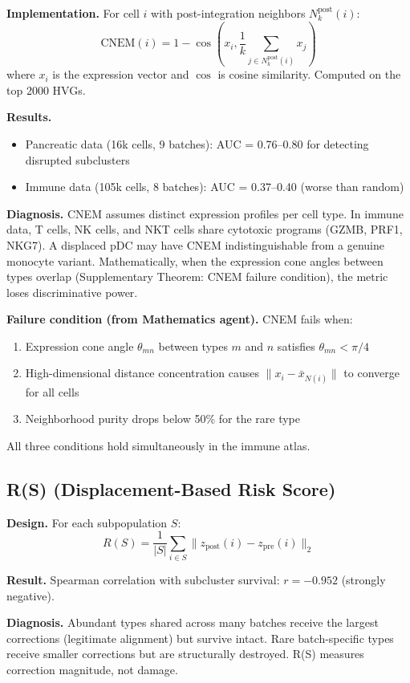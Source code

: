 \documentclass[10pt]{article}
\begin{document}
\textbf{Implementation.} For cell $i$ with post-integration neighbors $N_k^{\text{post}}(i)$:
$$\text{CNEM}(i) = 1 - \cos\left(x_i, \frac{1}{k}\sum_{j \in N_k^{\text{post}}(i)} x_j\right)$$
where $x_i$ is the expression vector and $\cos$ is cosine similarity. Computed on the top 2000 HVGs.

\textbf{Results.}
\begin{itemize}
\item Pancreatic data (16k cells, 9 batches): AUC = 0.76--0.80 for detecting disrupted subclusters
\item Immune data (105k cells, 8 batches): AUC = 0.37--0.40 (worse than random)
\end{itemize}

\textbf{Diagnosis.} CNEM assumes distinct expression profiles per cell type. In immune data, T cells, NK cells, and NKT cells share cytotoxic programs (GZMB, PRF1, NKG7). A displaced pDC may have CNEM indistinguishable from a genuine monocyte variant. Mathematically, when the expression cone angles between types overlap (Supplementary Theorem: CNEM failure condition), the metric loses discriminative power.

\textbf{Failure condition (from Mathematics agent).} CNEM fails when:
\begin{enumerate}
\item Expression cone angle $\theta_{mn}$ between types $m$ and $n$ satisfies $\theta_{mn} < \pi/4$
\item High-dimensional distance concentration causes $\|x_i - \bar{x}_{N(i)}\|$ to converge for all cells
\item Neighborhood purity drops below 50\% for the rare type
\end{enumerate}
All three conditions hold simultaneously in the immune atlas.

\subsection{R(S) (Displacement-Based Risk Score)}

\textbf{Design.} For each subpopulation $S$:
$$R(S) = \frac{1}{|S|}\sum_{i \in S} \|z_{\text{post}}(i) - z_{\text{pre}}(i)\|_2$$

\textbf{Result.} Spearman correlation with subcluster survival: $r = -0.952$ (strongly negative).

\textbf{Diagnosis.} Abundant types shared across many batches receive the largest corrections (legitimate alignment) but survive intact. Rare batch-specific types receive smaller corrections but are structurally destroyed. R(S) measures correction magnitude, not damage.
\end{document}
